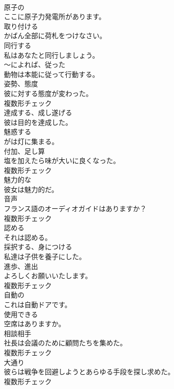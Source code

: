 \documentclass[8pt]{extreport}
\begin{document}
\begin{CJK}{UTF8}{min}
\\	[形容詞]	原子の	
\\	ここに原子力発電所があります。	
\\	[動詞]	取り付ける	
\\	かばん全部に荷札をつけなさい。	
\\	[動詞]	同行する	
\\	私はあなたと同行しましょう。	
\\	[形容詞]	〜によれば、従った	
\\	動物は本能に従って行動する。	
\\	[名詞]	姿勢、態度	
\\	彼に対する態度が変わった。	
\\	複数形チェック
\\	[動詞]	達成する、成し遂げる	
\\	彼は目的を達成した。	
\\	[動詞]	魅惑する	
\\	がは灯に集まる。	
\\	[名詞]	付加、足し算	
\\	塩を加えたら味が大いに良くなった。	
\\	複数形チェック
\\	[形容詞]	魅力的な	
\\	彼女は魅力的だ。	
\\	[名詞]	音声	
\\	フランス語のオーディオガイドはありますか？	
\\	複数形チェック
\\	[動詞]	認める	
\\	それは認める。	
\\	[動詞]	採択する、身につける	
\\	私達は子供を養子にした。	
\\	[名詞]	進歩、進出	
\\	よろしくお願いいたします。	
\\	複数形チェック
\\	[形容詞]	自動の	
\\	これは自動ドアです。	
\\	[形容詞]	使用できる	
\\	空席はありますか。	
\\	[名詞]	相談相手	
\\	社長は会議のために顧問たちを集めた。	
\\	複数形チェック
\\	[名詞]	大通り	
\\	彼らは戦争を回避しようとあらゆる手段を探し求めた。	
\\	複数形チェック

\end{CJK}
\end{document}
